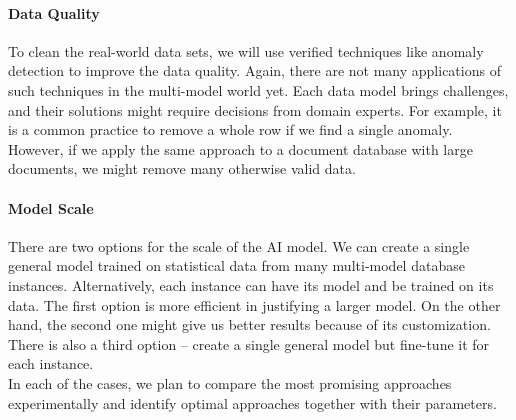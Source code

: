 \paragraph{Data Quality} To clean the real-world data sets, we will use verified techniques like anomaly detection to improve the data quality. Again, there are not many applications of such techniques in the multi-model world yet. Each data model brings challenges, and their solutions might require decisions from domain experts. For example, it is a common practice to remove a whole row if we find a single anomaly. However, if we apply the same approach to a document database with large documents, we might remove many otherwise valid data.

\paragraph{Model Scale} There are two options for the scale of the AI model. We can create a single general model trained on statistical data from many multi-model database instances. %
Alternatively, each instance can have its model and be trained on its data. The first option is more efficient in justifying a larger model. On the other hand, the second one might give us better results because of its customization. There is also a third option -- create a single general model but fine-tune it for each instance.\\

\noindent In each of the cases, we plan to compare the most promising approaches experimentally and identify optimal approaches together with their parameters. %



% 
% 

% 
